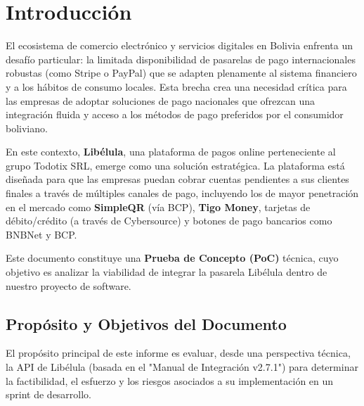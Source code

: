\section{Introducción}
    El ecosistema de comercio electrónico y servicios digitales en Bolivia enfrenta un desafío particular: la limitada 
    disponibilidad de pasarelas de pago internacionales robustas (como Stripe o PayPal) que se adapten plenamente al sistema 
    financiero y a los hábitos de consumo locales. Esta brecha crea una necesidad crítica para las empresas de adoptar soluciones 
    de pago nacionales que ofrezcan una integración fluida y acceso a los métodos de pago preferidos por el consumidor boliviano.\par

    En este contexto, \textbf{Libélula}, una plataforma de pagos online perteneciente al grupo Todotix SRL, emerge como una solución 
    estratégica. La plataforma está diseñada para que las empresas puedan cobrar cuentas pendientes a sus clientes finales a través 
    de múltiples canales de pago, incluyendo los de mayor penetración en el mercado como \textbf{SimpleQR} (vía BCP), \textbf{Tigo Money}, 
    tarjetas de débito/crédito (a través de Cybersource) y botones de pago bancarios como BNBNet y BCP.\par

    Este documento constituye una \textbf{Prueba de Concepto (PoC)} técnica, cuyo objetivo es analizar la viabilidad de 
    integrar la pasarela Libélula dentro de nuestro proyecto de software.\par

    \subsection{Propósito y Objetivos del Documento}
        El propósito principal de este informe es evaluar, desde una perspectiva técnica, la API de Libélula (basada en el 
        "Manual de Integración v2.7.1") para determinar la factibilidad, el esfuerzo y los riesgos asociados a su implementación 
        en un sprint de desarrollo.\par

